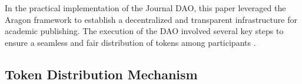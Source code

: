 \documentclass[lettersize,journal]{IEEEtran}
\begin{document}


In the practical implementation of the Journal DAO, this paper leveraged the Aragon framework to establish a decentralized and transparent infrastructure for academic publishing. The execution of the DAO involved several key steps to ensure a seamless and fair distribution of tokens among participants \cite{el2020overview}.





\subsection{Token Distribution Mechanism}
\end{document}
